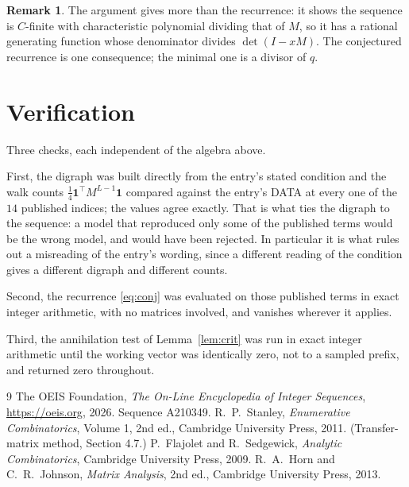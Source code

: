 \documentclass[11pt,a4paper]{article}
\theoremstyle{plain}
\theoremstyle{definition}
\newtheorem{remark}[theorem]{Remark}
\begin{document}
\begin{remark}
The argument gives more than the recurrence: it shows the sequence is $C$-finite with
characteristic polynomial dividing that of $M$, so it has a rational generating function
whose denominator divides $\det(I-xM)$. The conjectured recurrence is one consequence; the
minimal one is a divisor of $q$.
\end{remark}

\section{Verification}

Three checks, each independent of the algebra above.

First, the digraph was built directly from the entry's stated condition and the walk counts
$\tfrac1{4}\mathbf{1}^{\!\top}M^{L-1}\mathbf{1}$ compared against the entry's DATA at
every one of the $14$ published indices; the values agree exactly. That is what ties
the digraph to the sequence: a model that reproduced only some of the published terms would
be the wrong model, and would have been rejected. In particular it is what rules out a
misreading of the entry's wording, since a different reading of the condition gives a
different digraph and different counts.

Second, the recurrence \eqref{eq:conj} was evaluated on those published terms in exact
integer arithmetic, with no matrices involved, and vanishes wherever it applies.

Third, the annihilation test of Lemma~\ref{lem:crit} was run in exact integer arithmetic
until the working vector was identically zero, not to a sampled prefix, and returned zero
throughout.

\begin{thebibliography}{9}
 The OEIS Foundation, \emph{The On-Line Encyclopedia of Integer
Sequences}, \url{https://oeis.org}, 2026. Sequence A210349.
 R.~P.~Stanley, \emph{Enumerative Combinatorics}, Volume 1, 2nd ed.,
Cambridge University Press, 2011. (Transfer-matrix method, Section 4.7.)
 P.~Flajolet and R.~Sedgewick, \emph{Analytic Combinatorics}, Cambridge
University Press, 2009.
 R.~A.~Horn and C.~R.~Johnson, \emph{Matrix Analysis}, 2nd ed., Cambridge
University Press, 2013.
\end{thebibliography}
\end{document}

